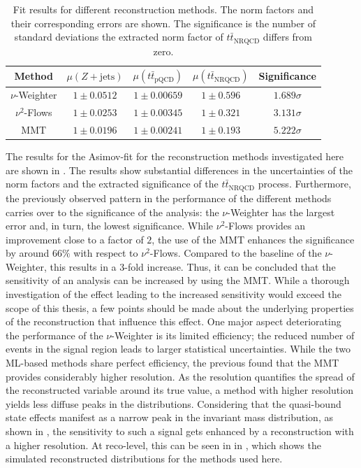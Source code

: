 \begin{table}
    \centering
    \caption{Fit results for different reconstruction methods. The norm factors and their corresponding errors are shown. The significance is the number of standard deviations the extracted norm factor of $t\bar{t}_{\text{NRQCD}}$ differs from zero.}
    \begin{tabular}{ccccc}
        \toprule
        Method & $\mu(Z+\text{jets})$    & $\mu(t\bar{t}_{\text{pQCD}})$ &
        $\mu(t\bar{t}_{\text{NRQCD}})$ & Significance\\
        \midrule
        $\nu$-Weighter & $1\pm 0.0512$ & $1\pm 0.00659$ & $1\pm 0.596$ &
        $1.689\sigma$ \\
        $\nu^2$-Flows & $1\pm 0.0253$ & $1\pm 0.00345$ & $1\pm 0.321$ &
        $3.131\sigma$ \\
        MMT &    $1\pm 0.0196$ & $1\pm 0.00241$ & $1\pm         0.193$ & $5.222\sigma$ \\
        \bottomrule
    \end{tabular}
    \label{tab:asimov_fit}
\end{table}
The results for the Asimov-fit for the reconstruction methods investigated here are shown in . The results show substantial differences in the uncertainties of the norm factors and the extracted significance of the $t\bar{t}_{\text{NRQCD}}$ process. Furthermore, the previously observed pattern in the performance of the different methods carries over to the significance of the analysis: the $\nu$-Weighter has the largest error and, in turn, the lowest significance. While $\nu^2$-Flows provides an improvement close to a factor of $2$, the use of the MMT enhances the significance by around $66\%$ with respect to $\nu^2$-Flows. Compared to the baseline of the $\nu$-Weighter, this results in a 3-fold increase.
Thus, it can be concluded that the sensitivity of an analysis can be increased by using the MMT.
While a thorough investigation of the effect leading to the increased sensitivity would exceed the scope of this thesis, a few points should be made about the underlying properties of the reconstruction that influence this effect. One major aspect deteriorating the performance of the $\nu$-Weighter is its limited efficiency; the reduced number of events in the signal region leads to larger statistical uncertainties. While the two ML-based methods share perfect efficiency, the previous  found that the MMT provides considerably higher resolution. As the resolution quantifies the spread of the reconstructed variable around its true value, a method with higher resolution yields less diffuse peaks in the distributions. Considering that the quasi-bound state effects manifest as a narrow peak in the invariant mass distribution, as shown in , the sensitivity to such a signal gets enhanced by a reconstruction with a higher resolution. At reco-level, this can be seen in  in , which shows the simulated reconstructed distributions for the methods used here.
